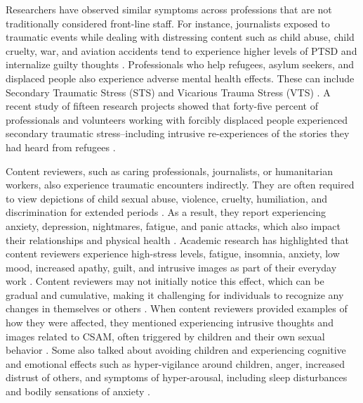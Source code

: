 Researchers have observed similar symptoms across professions that are not traditionally considered front-line staff. For instance, journalists exposed to traumatic events while dealing with distressing content such as child abuse, child cruelty, war, and aviation accidents tend to experience higher levels of PTSD and internalize guilty thoughts \cite{browne2012,spence_psychological_2023}. Professionals who help refugees, asylum seekers, and displaced people also experience adverse mental health effects. These can include Secondary Traumatic Stress (STS) and Vicarious Trauma Stress (VTS) \cite{ebren2022}. A recent study of fifteen research projects showed that forty-five percent of professionals and volunteers working with forcibly displaced people experienced secondary traumatic stress--including intrusive re-experiences of the stories they had heard from refugees \cite{roberts2021,ebren2022}.

Content reviewers, such as caring professionals, journalists, or humanitarian workers, also experience traumatic encounters indirectly. They are often required to view depictions of child sexual abuse, violence, cruelty, humiliation, and discrimination for extended periods \cite{steiger_psychological_2021,spence_psychological_2023}. As a result, they report experiencing anxiety, depression, nightmares, fatigue, and panic attacks, which also impact their relationships and physical health \cite{roberts_behind_2019,newton2019,newton2020b,spence_psychological_2023}. Academic research has highlighted that content reviewers experience high-stress levels, fatigue, insomnia, anxiety, low mood, increased apathy, guilt, and intrusive images as part of their everyday work \cite{dosono2019,lo2018,cook_awe_2022,benjelloun2020,spence_psychological_2023}. Content reviewers may not initially notice this effect, which can be gradual and cumulative, making it challenging for individuals to recognize any changes in themselves or others \cite{krause2009,ledingham2019,spence_psychological_2023}. When content reviewers provided examples of how they were affected, they mentioned experiencing intrusive thoughts and images related to CSAM, often triggered by children and their own sexual behavior \cite{spence_psychological_2023}. Some also talked about avoiding children and experiencing cognitive and emotional effects such as hyper-vigilance around children, anger, increased distrust of others, and symptoms of hyper-arousal, including sleep disturbances and bodily sensations of anxiety \cite{spence_psychological_2023}. 

